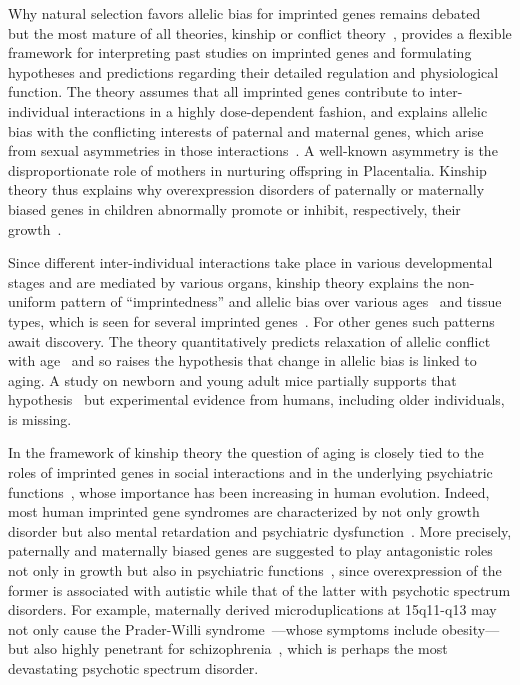 \documentclass[letterpaper]{article}
\begin{document}
Why natural selection favors allelic bias for imprinted genes remains
debated~\cite{Wilkins2003,McDonald2005,Keverne2015} but the most mature of all
theories, kinship or conflict theory~\cite{Wilkins2003}, provides a flexible
framework for interpreting past studies on imprinted genes and formulating
hypotheses and predictions regarding their detailed regulation and
physiological function.  The theory assumes that all imprinted genes contribute to
inter-individual interactions in a highly dose-dependent fashion, and explains
allelic bias with the conflicting interests of paternal and maternal genes,
which arise from sexual asymmetries in those interactions~\cite{Wilkins2003}.
A well-known asymmetry is the disproportionate role of mothers in
nurturing offspring in Placentalia.  Kinship theory thus explains why
overexpression disorders of paternally or maternally biased genes in children
abnormally promote or inhibit, respectively, their
growth~\cite{Plasschaert2014,Peters2014}.

Since different inter-individual interactions take place in various
developmental stages and are mediated by various organs, kinship theory
explains the non-uniform pattern of ``imprintedness'' and allelic bias over
various ages~\cite{Bourke2007} and tissue types, which is seen for several
imprinted genes~\cite{Plasschaert2014,Peters2014}.  For other genes such
patterns await discovery.  The theory quantitatively predicts relaxation of
allelic conflict with age~\cite{Ubeda2012} and so raises the hypothesis that
change in allelic bias is linked to aging.  A study on newborn and young adult mice
partially supports that hypothesis~\cite{Perez2015} but experimental evidence
from humans, including older individuals, is missing.

In the framework of kinship theory the question of aging is closely tied to
the roles of imprinted genes in social interactions and in the underlying
psychiatric functions~\cite{Ubeda2012,Wilkins2003}, whose importance has been
increasing in human evolution.  Indeed, most human imprinted gene syndromes
are characterized by not only growth disorder but also mental retardation and
psychiatric dysfunction~\cite{Plasschaert2014,Peters2014}.  More precisely,
paternally and maternally biased genes are suggested to play antagonistic
roles not only in growth but also in psychiatric functions~\cite{Crespi2008a},
since overexpression of the former is associated with autistic while that of
the latter with psychotic spectrum disorders.  For example, maternally derived
microduplications at 15q11-q13 may not only cause the Prader-Willi
syndrome~\cite{Peters2014}---whose symptoms include obesity---but also highly
penetrant for schizophrenia~\cite{Ingason2011,Sullivan2012}, which is perhaps the most devastating
psychotic spectrum disorder.
\end{document}
